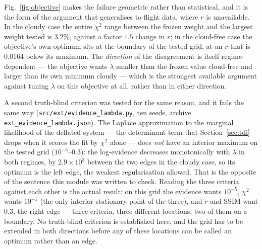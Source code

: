 \documentclass[twocolumn,10pt]{article}
\begin{document}
Fig.~\ref{fig:objective} makes the failure geometric rather than statistical,
and it is the form of the argument that generalises to flight data, where $r$ is
unavailable. In the cloudy case the entire $\chi^2$ range between the frozen
weight and the largest weight tested is $3.2\%$, against a factor $1.5$ change
in $r$; in the cloud-free case the objective's own optimum sits at the boundary
of the tested grid, at an $r$ that is $0.0164$ below its maximum. The
\emph{direction} of the disagreement is itself regime-dependent --- the
objective wants $\lambda$ smaller than the frozen value cloud-free and larger
than its own minimum cloudy --- which is the strongest available argument
against tuning $\lambda$ on this objective at all, rather than in either
direction.

A second truth-blind criterion was tested for the same reason, and it fails the
same way ({\tt src/ext/evidence\_lambda.py}, ten seeds, archive
{\tt ext\_evidence\_lambda.json}). The Laplace approximation to the marginal
likelihood of the deflated system --- the determinant term that
Section~\ref{sec:tdi} drops when it scores the fit by $\chi^2$ alone --- does
\emph{not} have an interior maximum on the tested grid
($10^{-5}$--$0.3$): the log-evidence decreases monotonically with $\lambda$ in
both regimes, by $2.9\times10^{3}$ between the two edges in the cloudy case, so
its optimum is the left edge, the weakest regularisation allowed. That is the opposite of the sentence this module was written to check.
Reading the three criteria against each other is the actual result: on this grid
the evidence wants $10^{-5}$, $\chi^2$ wants $10^{-1}$ (the only interior
stationary point of the three), and $r$ and SSIM want $0.3$, the right edge ---
three criteria, three different locations, two of them on a boundary. No
truth-blind criterion is established here, and the grid has to be extended in
both directions before any of these locations can be called an optimum rather
than an edge.
\end{document}
